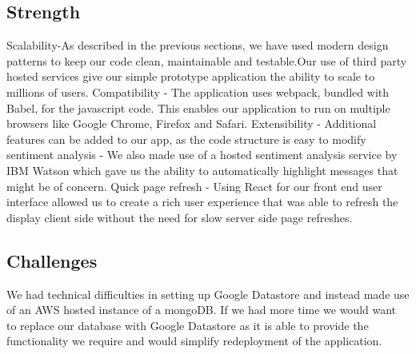 \documentclass[a4paper,10pt]{article}
\begin{document}
\subsection{Strength}
Scalability-As described in the previous sections, we have used modern design patterns to keep our code clean, maintainable and testable.Our use of third party hosted services give our simple prototype application the ability to scale to millions of users.
\newline
Compatibility - The application uses webpack, bundled with Babel, for the javascript code. This enables our application to run on multiple browsers like Google Chrome, Firefox and Safari.
\newline
Extensibility - Additional features can be added to our app, as the code structure is easy to modify
\newline
sentiment analysis - We also made use of a hosted sentiment analysis service by IBM Watson which gave us the ability to automatically highlight messages that might be of concern.
\newline
Quick page refresh - Using React for our front end user interface allowed us to create a rich user experience that was able to refresh the display client side without the need for slow server side page refreshes.
\subsection{Challenges}
We had technical difficulties in setting up Google Datastore and instead made use of an AWS hosted instance of a mongoDB.  If we had more time we would want to replace our database with Google Datastore as it is able to provide the functionality we require and would simplify redeployment of the application.
\end{document}
